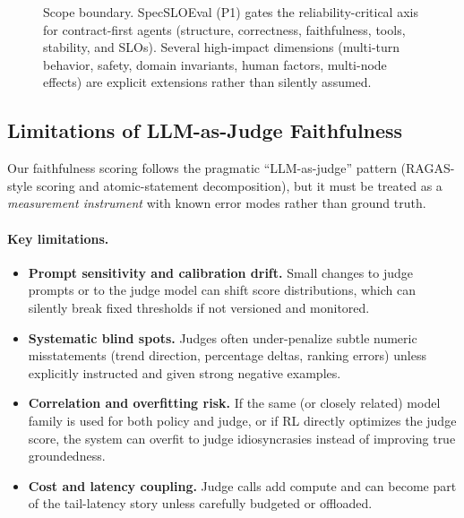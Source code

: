 \documentclass[11pt]{article}
\begin{document}
\begin{figure}[t]
\caption{Scope boundary.
SpecSLOEval (P1) gates the reliability-critical axis for contract-first agents (structure, correctness, faithfulness, tools, stability, and SLOs).
Several high-impact dimensions (multi-turn behavior, safety, domain invariants, human factors, multi-node effects) are explicit extensions rather than silently assumed.}
\label{fig:coverage-map}
\end{figure}

\subsection{Limitations of LLM-as-Judge Faithfulness}

Our faithfulness scoring follows the pragmatic ``LLM-as-judge'' pattern (RAGAS-style scoring and atomic-statement decomposition), but it must be treated as a \emph{measurement instrument} with known error modes rather than ground truth.

\paragraph{Key limitations.}
\begin{itemize}[leftmargin=12pt]
    \item \textbf{Prompt sensitivity and calibration drift.}
    Small changes to judge prompts or to the judge model can shift score distributions, which can silently break fixed thresholds if not versioned and monitored.

    \item \textbf{Systematic blind spots.}
    Judges often under-penalize subtle numeric misstatements (trend direction, percentage deltas, ranking errors) unless explicitly instructed and given strong negative examples.

    \item \textbf{Correlation and overfitting risk.}
    If the same (or closely related) model family is used for both policy and judge, or if RL directly optimizes the judge score, the system can overfit to judge idiosyncrasies instead of improving true groundedness.

    \item \textbf{Cost and latency coupling.}
    Judge calls add compute and can become part of the tail-latency story unless carefully budgeted or offloaded.
\end{itemize}
\end{document}
